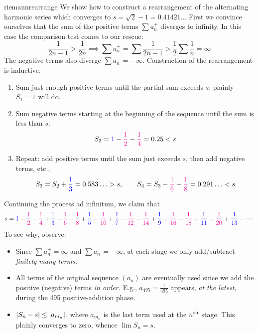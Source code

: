 \begin{example}{}{riemannrearrange}
We show how to construct a rearrangement of the alternating harmonic series which converges to $s=\sqrt 2-1=0.41421\ldots$\smallbreak
First we convince ourselves that the sum of the positive terms $\sum a_n^+$ diverges to infinity. In this case the comparison test comes to our rescue:
\[\frac 1{2n-1}>\frac 1{2n}\implies \sum a_n^+=\sum \frac 1{2n-1}>\frac 12\sum \frac 1n=\infty\]
The negative terms also diverge $\sum a_n^-=-\infty$. Construction of the rearrangement is inductive.
\begin{enumerate}
  \item Sum just enough positive terms until the partial sum exceeds $s$: plainly $S_1=1$ will do.
	\item Sum negative terms starting at the beginning of the sequence until the sum is less than $s$:
	\[S_2=\textcolor{blue}{1}-\textcolor{magenta}{\frac 12}-\textcolor{magenta}{\frac 14}=0.25<s\]
	\item Repeat: add positive terms until the sum just exceeds $s$, then add negative terms, etc.,
	\begin{gather*}
	S_3=S_2+\textcolor{blue}{\frac 13}=0.583\ldots>s,\qquad S_4=S_3 -\textcolor{magenta}{\frac 16} -\textcolor{magenta}{\frac 18}=0.291\ldots<s
	\end{gather*}
\end{enumerate}
Continuing the process ad infinitum, we claim that
\[
	s=\textcolor{blue}{1}-\textcolor{magenta}{\frac 12}-\textcolor{magenta}{\frac 14} +\textcolor{blue}{\frac 13} -\textcolor{magenta}{\frac 16} -\textcolor{magenta}{\frac 18} +\textcolor{blue}{\frac 15} -\textcolor{magenta}{\frac 1{10}} +\textcolor{blue}{\frac 17}  -\textcolor{magenta}{\frac 1{12}}  -\textcolor{magenta}{\frac 1{14}} +\textcolor{blue}{\frac 19} -\textcolor{magenta}{\frac 1{16}} -\textcolor{magenta}{\frac 1{18}} +\textcolor{blue}{\frac 1{11}}  -\textcolor{magenta}{\frac 1{20}} +\textcolor{blue}{\frac 1{13}} -\cdots 
\]
To see why, observe:
\begin{itemize}
  \item Since $\sum a_n^+=\infty$ and $\sum a_n^-=-\infty$, at each stage we only add/subtract \emph{finitely many terms.}
  \item All terms of the original sequence $(a_n)$ are eventually used since we add the positive (negative) terms \emph{in order.} E.g., $a_{495}=\frac 1{495}$ appears, \emph{at the latest,} during the 495\th{} positive-addition phase.
  \item $\left| S_n-s\right|\le \left| a_{m_n}\right|$, where $a_{m_n}$ is the last term used at the $n\textsuperscript{th}$ stage. This plainly converges to zero, whence $\lim S_n=s$. 
\end{itemize}
\end{example}


